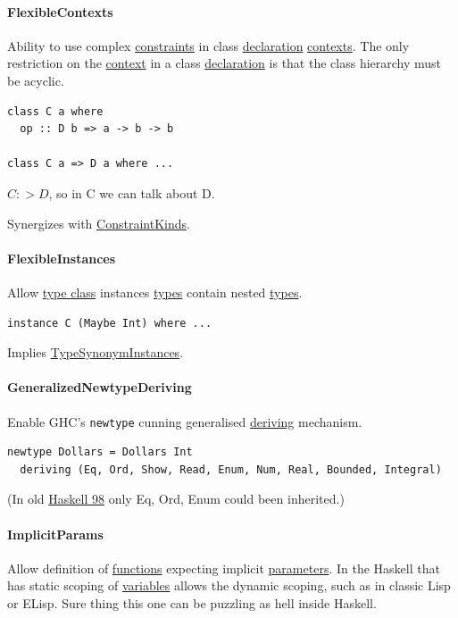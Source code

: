 \documentclass[a4paper,14pt,oneside]{book}
\begin{document}
\paragraph{\label{org42cd537}FlexibleContexts}
\label{sec:org5f65799}
Ability to use complex \hyperref[org7ab0abf]{constraints} in class \hyperref[orgc46bca7]{declaration} \hyperref[org07821d4]{contexts}.
The only restriction on the \hyperref[orgec5e5c2]{context} in a class \hyperref[orgc46bca7]{declaration} is that the class hierarchy must be acyclic.
\begin{verbatim}
class C a where
  op :: D b => a -> b -> b

class C a => D a where ...
\end{verbatim}
\(C :> D\), so in C we can talk about D.

Synergizes with \hyperref[org70131c2]{ConstraintKinds}.

\paragraph{\label{orgcd82699}FlexibleInstances}
\label{sec:org4193172}
Allow \hyperref[org5219ea8]{type class} instances \hyperref[org40b6d66]{types} contain nested \hyperref[org40b6d66]{types}.
\begin{verbatim}
instance C (Maybe Int) where ...
\end{verbatim}
Implies \hyperref[org0a58647]{TypeSynonymInstances}.

\paragraph{\label{org0766ac5}GeneralizedNewtypeDeriving}
\label{sec:org407435d}
Enable GHC’s \texttt{newtype} cunning generalised \hyperref[org4fc1bae]{deriving} mechanism.
\begin{verbatim}
newtype Dollars = Dollars Int
  deriving (Eq, Ord, Show, Read, Enum, Num, Real, Bounded, Integral)
\end{verbatim}
(In old \hyperref[org7495aa0]{Haskell 98} only Eq, Ord, Enum could been inherited.)

\paragraph{\label{orgfa1867b}ImplicitParams}
\label{sec:orgc5838a7}
Allow definition of \hyperref[org9766947]{functions} expecting implicit \hyperref[org42333bf]{parameters}. In the Haskell that has static scoping of \hyperref[org2f441a3]{variables} allows the dynamic scoping, such as in classic Lisp or ELisp.
Sure thing this one can be puzzling as hell inside Haskell.
\end{document}
